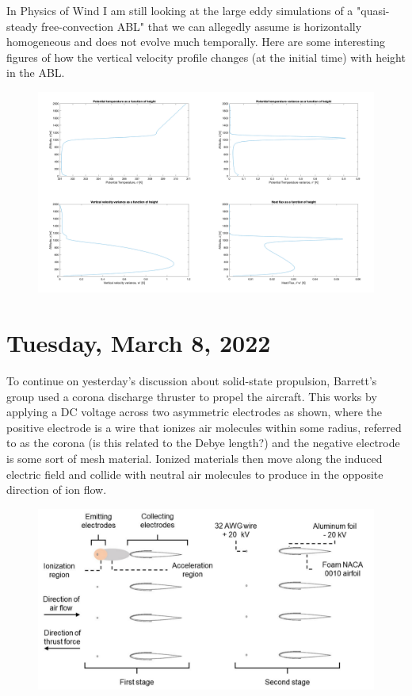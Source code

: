 \documentclass[12pt]{article}
\begin{document}
\par
In Physics of Wind I am still looking at the large eddy simulations of a "quasi-steady free-convection ABL" that we can allegedly assume is horizontally homogeneous and does not evolve much temporally. Here are some interesting figures of how the vertical velocity profile changes (at the initial time) with height in the ABL.

\begin{figure}[H]
\centering
\includegraphics[width=\linewidth]{images/ABL_Vertical_Profiles.pdf}
\end{figure}


\section{Tuesday, March 8, 2022}
\par
To continue on yesterday’s discussion about solid-state propulsion, Barrett’s group used a corona discharge thruster to propel the aircraft. This works by applying a DC voltage across two asymmetric electrodes as shown, where the positive electrode is a wire that ionizes air molecules within some radius, referred to as the corona (is this related to the Debye length?) and the negative electrode is some sort of mesh material. Ionized materials then move along the induced electric field and collide with neutral air molecules to produce in the opposite direction of ion flow. 

\begin{figure}[H]
\centering
\includegraphics[width=\linewidth]{images/thrustdiagram.pdf}
\end{figure}
\end{document}
